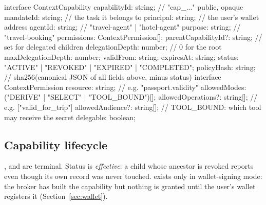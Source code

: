\documentclass[11pt,a4paper]{article}
\begin{document}
\begin{codebox}[language=ts]
interface ContextCapability {
  capabilityId: string;          // "cap_..."   public, opaque
  mandateId: string;             // the task it belongs to
  principal: string;             // the user's wallet address
  agentId: string;               // "travel-agent" | "hotel-agent"
  purpose: string;               // "travel-booking"
  permissions: ContextPermission[];
  parentCapabilityId?: string;   // set for delegated children
  delegationDepth: number;       // 0 for the root
  maxDelegationDepth: number;
  validFrom: string;  expiresAt: string;
  status: "ACTIVE" | "REVOKED" | "EXPIRED" | "COMPLETED";
  policyHash: string;            // sha256(canonical JSON of all fields above, minus status)
}
interface ContextPermission {
  resource: string;              // e.g. "passport.validity"
  allowedModes: ("DERIVE" | "SELECT" | "TOOL_BOUND")[];
  allowedOperations?: string[];  // e.g. ["valid_for_trip"]
  allowedAudience?: string[];    // TOOL_BOUND: which tool may receive the secret
  delegable: boolean;
}
\end{codebox}

\subsection{Capability lifecycle}
\begin{center}
\end{center}

,  and  are terminal. Status is \emph{effective}: a child whose ancestor is revoked reports  even though its own record was never touched.  exists only in wallet-signing mode: the broker has built the capability but nothing is granted until the user's wallet registers it (Section~\ref{sec:wallet}).
\end{document}
